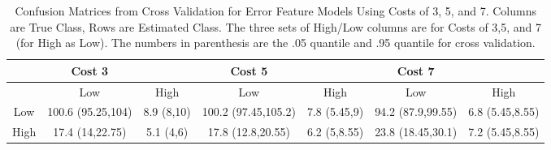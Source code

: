 \begin{table}[H]
\begin{center}
\begin{tabular}{c|cc|cc|cc|}
   & Cost 3 &  & Cost 5 &  & Cost 7 &  \\ 
   \hline
 & Low & High & Low & High & Low & High \\ 
   \hline
Low & 100.6 (95.25,104) & 8.9 (8,10) & 100.2 (97.45,105.2) & 7.8 (5.45,9) & 94.2 (87.9,99.55) & 6.8 (5.45,8.55) \\ 
  High & 17.4 (14,22.75) & 5.1 (4,6) & 17.8 (12.8,20.55) & 6.2 (5,8.55) & 23.8 (18.45,30.1) & 7.2 (5.45,8.55) \\ 
  \end{tabular}
\caption{Confusion Matrices from Cross Validation for Error Feature Models Using Costs of 3, 5, and 7. Columns are True Class, Rows are Estimated Class. The three sets of High/Low columns are for Costs of 3,5, and 7 (for High as Low). The numbers in parenthesis are the .05 quantile and .95 quantile for cross validation.}
\label{tab:confusionErrors}
\end{center}
\end{table}
